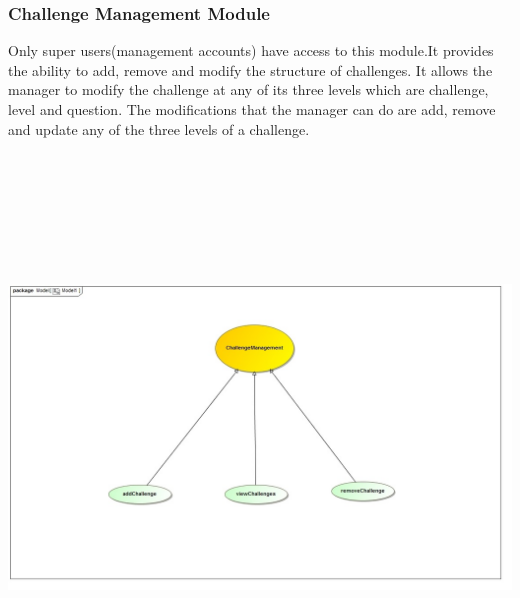 \documentclass[english]{article}
\begin{document}
		\subsubsection{Challenge Management Module}
		Only super users(management accounts) have access to this module.It provides the ability to add, remove and modify the structure of challenges. It allows the manager to modify the challenge at any of its three levels which are challenge, level and question. The modifications that the manager can do are add, remove and update any of the three levels of a challenge.
		
		\includegraphics[width=15cm,height=15cm,keepaspectratio]{challengeManagement.jpg}
		
\end{document}
